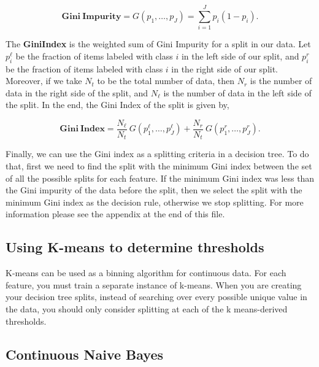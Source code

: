 \begin{equation}
\mathbf {Gini\: Impurity} = G(p_1, \ldots, p_J) = \sum_{i =1}^J p_{i}(1-p_{i}).
\end{equation}


The \textbf{Gini\:Index} is the weighted sum of Gini Impurity for a split in our data. Let $p_i^{\ell}$ be the fraction of items labeled with class $i$ in the left side of our split, and $p_i^{r}$ be the fraction of items labeled with class $i$ in the right side of our split. Moreover, if we take $N_{t}$ to be the total number of data, then $N_{r}$ is the number of data in the right side of the split, and $N_{\ell}$ is the number of data in the left side of the split. In the end, the Gini Index of the split is given by,

\begin{equation}
\mathbf{Gini\: Index} = \frac{N_{\ell}}{N_{t}}\:G(p_1^{\ell}, \hdots, p_J^{\ell}) + \frac{N_{r}}{N_{t}}\:G(p_1^r, \hdots, p_J^r).
\end{equation}

Finally, we can use the Gini index as a splitting criteria in a decision tree. To do that, first we need to find the split with the minimum Gini index between the set of all the possible splits for each feature. If the minimum Gini index was less than the Gini impurity of the data before the split, then we select the split with the minimum Gini index as the decision rule, otherwise we stop splitting. For more information please see the appendix at the end of this file. 


\subsection*{Using K-means to determine thresholds}
K-means can be used as a binning algorithm for continuous data. For each feature, you must train a separate instance of k-means. When you are creating your decision tree splits, instead of searching over every possible unique value in the data, you should only consider splitting at each of the k means-derived thresholds.

\subsection*{Continuous Naive Bayes}


